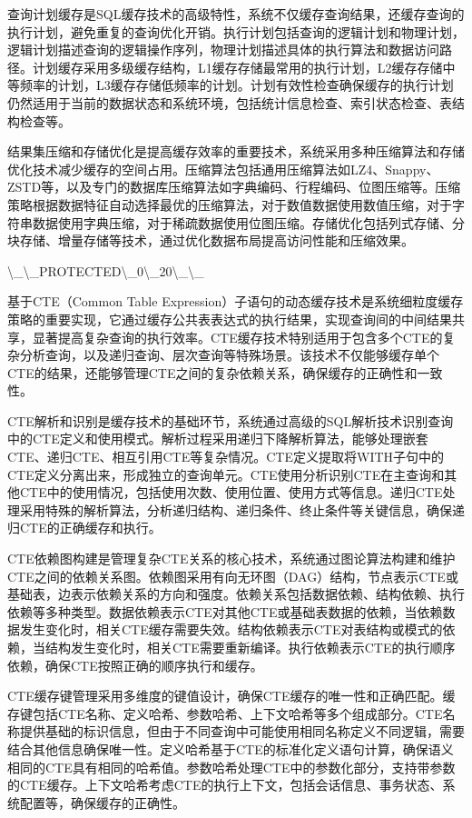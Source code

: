 查询计划缓存是SQL缓存技术的高级特性，系统不仅缓存查询结果，还缓存查询的执行计划，避免重复的查询优化开销。执行计划包括查询的逻辑计划和物理计划，逻辑计划描述查询的逻辑操作序列，物理计划描述具体的执行算法和数据访问路径。计划缓存采用多级缓存结构，L1缓存存储最常用的执行计划，L2缓存存储中等频率的计划，L3缓存存储低频率的计划。计划有效性检查确保缓存的执行计划仍然适用于当前的数据状态和系统环境，包括统计信息检查、索引状态检查、表结构检查等。

结果集压缩和存储优化是提高缓存效率的重要技术，系统采用多种压缩算法和存储优化技术减少缓存的空间占用。压缩算法包括通用压缩算法如LZ4、Snappy、ZSTD等，以及专门的数据库压缩算法如字典编码、行程编码、位图压缩等。压缩策略根据数据特征自动选择最优的压缩算法，对于数值数据使用数值压缩，对于字符串数据使用字典压缩，对于稀疏数据使用位图压缩。存储优化包括列式存储、分块存储、增量存储等技术，通过优化数据布局提高访问性能和压缩效果。

\textbackslash{}_\textbackslash{}_PROTECTED\textbackslash{}_0\textbackslash{}_20\textbackslash{}_\textbackslash{}_

基于CTE（Common Table Expression）子语句的动态缓存技术是系统细粒度缓存策略的重要实现，它通过缓存公共表表达式的执行结果，实现查询间的中间结果共享，显著提高复杂查询的执行效率。CTE缓存技术特别适用于包含多个CTE的复杂分析查询，以及递归查询、层次查询等特殊场景。该技术不仅能够缓存单个CTE的结果，还能够管理CTE之间的复杂依赖关系，确保缓存的正确性和一致性。

CTE解析和识别是缓存技术的基础环节，系统通过高级的SQL解析技术识别查询中的CTE定义和使用模式。解析过程采用递归下降解析算法，能够处理嵌套CTE、递归CTE、相互引用CTE等复杂情况。CTE定义提取将WITH子句中的CTE定义分离出来，形成独立的查询单元。CTE使用分析识别CTE在主查询和其他CTE中的使用情况，包括使用次数、使用位置、使用方式等信息。递归CTE处理采用特殊的解析算法，分析递归结构、递归条件、终止条件等关键信息，确保递归CTE的正确缓存和执行。

CTE依赖图构建是管理复杂CTE关系的核心技术，系统通过图论算法构建和维护CTE之间的依赖关系图。依赖图采用有向无环图（DAG）结构，节点表示CTE或基础表，边表示依赖关系的方向和强度。依赖关系包括数据依赖、结构依赖、执行依赖等多种类型。数据依赖表示CTE对其他CTE或基础表数据的依赖，当依赖数据发生变化时，相关CTE缓存需要失效。结构依赖表示CTE对表结构或模式的依赖，当结构发生变化时，相关CTE需要重新编译。执行依赖表示CTE的执行顺序依赖，确保CTE按照正确的顺序执行和缓存。

CTE缓存键管理采用多维度的键值设计，确保CTE缓存的唯一性和正确匹配。缓存键包括CTE名称、定义哈希、参数哈希、上下文哈希等多个组成部分。CTE名称提供基础的标识信息，但由于不同查询中可能使用相同名称定义不同逻辑，需要结合其他信息确保唯一性。定义哈希基于CTE的标准化定义语句计算，确保语义相同的CTE具有相同的哈希值。参数哈希处理CTE中的参数化部分，支持带参数的CTE缓存。上下文哈希考虑CTE的执行上下文，包括会话信息、事务状态、系统配置等，确保缓存的正确性。

